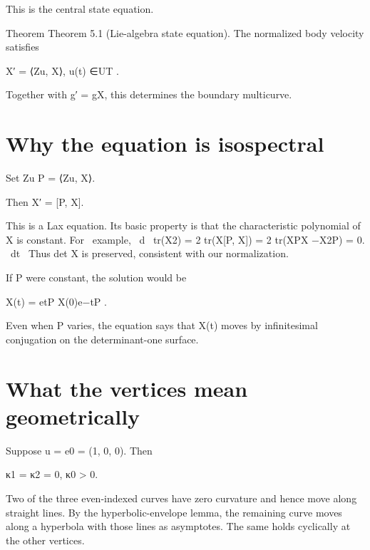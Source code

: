 This is the central state equation.


\begin{statementbox}{Theorem}
Theorem 5.1 (Lie-algebra state equation). The normalized body velocity satisfies
\end{statementbox}

\begin{displaytext}
[Zu, X] X′ = ⟨Zu, X⟩, u(t) ∈UT .
\end{displaytext}

Together with g′ = gX, this determines the boundary multicurve.


\section{Why the equation is isospectral}

Set Zu P = ⟨Zu, X⟩.


Then X′ = [P, X].


\begin{displaytext}
This is a Lax equation. Its basic property is that the characteristic polynomial of X is constant. For \
example, \
d \
tr(X2) = 2 tr(X[P, X]) = 2 tr(XPX −X2P) = 0. \
dt \
Thus det X is preserved, consistent with our normalization.
\end{displaytext}

If P were constant, the solution would be


X(t) = etP X(0)e−tP .


Even when P varies, the equation says that X(t) moves by infinitesimal conjugation on the determinant-one surface.


\section{What the vertices mean geometrically}

\begin{displaytext}
Suppose u = e0 = (1, 0, 0). Then
\end{displaytext}

\begin{displaytext}
κ1 = κ2 = 0, κ0 > 0.
\end{displaytext}

Two of the three even-indexed curves have zero curvature and hence move along straight lines. By the hyperbolic-envelope lemma, the remaining curve moves along a hyperbola with those lines as asymptotes. The same holds cyclically at the other vertices.



